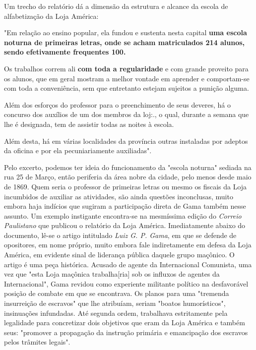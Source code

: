 Um trecho do relatório dá a dimensão da estrutura e alcance da escola de
alfabetização da Loja América:

"Em relação ao ensino popular, ela fundou e sustenta nesta capital
\textbf{uma escola noturna de primeiras letras, onde se acham
matriculados 214 alunos, sendo efetivamente frequentes 100.}

Os trabalhos correm ali \textbf{com toda a regularidade} e com grande
proveito para os alunos, que em geral mostram a melhor vontade em
aprender e comportam-se com toda a conveniência, sem que entretanto
estejam sujeitos a punição alguma.

Além dos esforços do professor para o preenchimento de seus deveres, há
o concurso dos auxílios de um dos membros da loj:., o qual, durante a
semana que lhe é designada, tem de assistir todas as noites à escola.

Além desta, há em várias localidades da província outras instaladas por
adeptos da oficina e por ela pecuniariamente auxiliadas".

Pelo excerto, podemos ter ideia do funcionamento da "escola noturna"
sediada na rua 25 de Março, então periferia da área nobre da cidade,
pelo menos desde maio de 1869. Quem seria o professor de primeiras
letras ou mesmo os fiscais da Loja incumbidos de auxiliar as atividades,
são ainda questões inconclusas, muito embora haja indícios que sugiram a
participação direta de Gama também nesse assunto. Um exemplo instigante
encontra-se na mesmíssima edição do \emph{Correio Paulistano} que
publicou o relatório da Loja América. Imediatamente abaixo do documento,
lê-se o artigo intitulado \emph{Luiz G. P. Gama}, em que se defende de
opositores, em nome próprio, muito embora fale indiretamente em defesa
da Loja América, em evidente sinal de liderança pública daquele grupo
maçônico. O artigo é uma peça histórica. Acusado de agente da
Internacional Comunista, uma vez que "esta Loja maçônica
trabalha{[}ria{]} sob os influxos de agentes da Internacional", Gama
revidou como experiente militante político na desfavorável posição de
combate em que se encontrava. Os planos para uma "tremenda insurreição
de escravos" que lhe atribuíam, seriam "boatos humorísticos",
insinuações infundadas. Até segunda ordem, trabalhava estritamente pela
legalidade para concretizar dois objetivos que eram da Loja América e
também seus: "promover a propagação da instrução primária e emancipação
dos escravos pelos trâmites legais".

